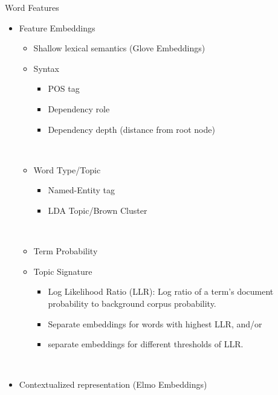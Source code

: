 \begin{frame}{Word Features}

    \begin{itemize}
        \item Feature Embeddings
        \begin{itemize}
        \item Shallow lexical semantics (Glove Embeddings)
        \item<2-> Syntax
            \begin{itemize}
        \item POS tag
        \item Dependency role
        \item Dependency depth (distance from root node)
    \end{itemize}~\\
        \item<3-> Word Type/Topic
            \begin{itemize}
        \item Named-Entity tag
        \item LDA Topic/Brown Cluster 
             \end{itemize}~\\
         \item<4-> Term Probability
         \item<4-> Topic Signature
              \begin{itemize}
                  \item Log Likelihood Ratio (LLR): Log ratio of a term's document probability to  background corpus probability.
                \item Separate embeddings for words with highest LLR, and/or
                 \item separate embeddings for different thresholds of LLR.
              \end{itemize}

        \end{itemize}
~\\
        \item<5-> Contextualized representation (Elmo Embeddings)
    \end{itemize}


\end{frame}

